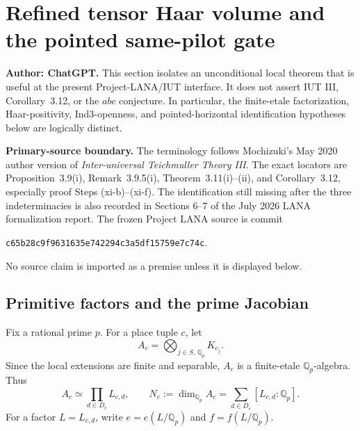 
\section{Refined tensor Haar volume and the pointed same-pilot gate}
\label{sec:refined-tensor-haar-same-pilot}

\noindent\textbf{Author: ChatGPT.}\quad
This section isolates an unconditional local theorem that is useful at the
present Project-LANA/IUT interface.  It does not assert IUT III,
Corollary~3.12, or the $abc$ conjecture.  In particular, the finite-etale
factorization, Haar-positivity, Ind3-openness, and pointed-horizontal
identification hypotheses below are logically distinct.

\noindent\textbf{Primary-source boundary.}
The terminology follows Mochizuki's May 2020 author version of
\emph{Inter-universal Teichmuller Theory III}.  The exact locators are
Proposition~3.9(i), Remark~3.9.5(i), Theorem~3.11(i)--(ii), and
Corollary~3.12, especially proof Steps (xi-b)--(xi-f).  The identification
still missing after the three indeterminacies is also recorded in Sections
6--7 of the July 2026 LANA formalization report.  The frozen Project LANA
source is commit
\begin{center}
\texttt{c65b28c9f9631635e742294c3a5df15759e7c74c}.
\end{center}
No source claim is imported as a premise unless it is displayed below.

\subsection{Primitive factors and the prime Jacobian}

Fix a rational prime $p$.  For a place tuple $c$, let
\[
 A_c=\bigotimes_{j\in S,\,\mathbb Q_p}K_{c_j}.
\]
Since the local extensions are finite and separable, $A_c$ is a finite-etale
$\mathbb Q_p$-algebra.  Thus
\begin{equation}
 A_c\simeq\prod_{d\in D_c}L_{c,d},
 \qquad
 N_c:=\dim_{\mathbb Q_p}A_c
      =\sum_{d\in D_c}[L_{c,d}:\mathbb Q_p].
 \label{eq:primitive-decomposition}
\end{equation}
For a factor $L=L_{c,d}$, write $e=e(L/\mathbb Q_p)$ and
$f=f(L/\mathbb Q_p)$.

